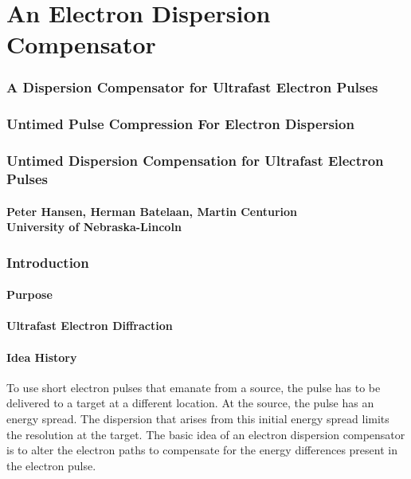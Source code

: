 \documentclass[12pt,letterpaper]{article}
\begin{document}
\part*{An Electron Dispersion Compensator}
\section*{A Dispersion Compensator for Ultrafast Electron Pulses}
\section*{Untimed Pulse Compression For Electron Dispersion}
\section*{Untimed Dispersion Compensation for Ultrafast Electron Pulses}

\subsection*{Peter Hansen, Herman Batelaan, Martin Centurion\\University of Nebraska-Lincoln}

\section{Introduction}
\subsection{Purpose}
\subsection{Ultrafast Electron Diffraction}
\subsection{Idea History}

To use short electron pulses that emanate from a source, the pulse has to be delivered to a target at a different location. At the source, the pulse has an energy spread. The dispersion that arises from this initial energy spread limits the resolution at the target. The basic idea of an electron dispersion compensator is to alter the electron paths to compensate for the energy differences present in the electron pulse.

\end{document}
